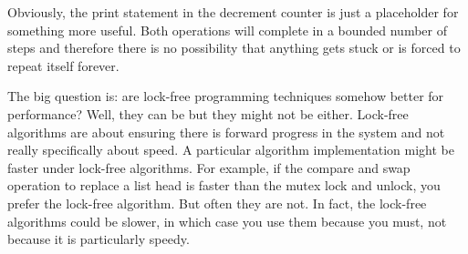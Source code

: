 Obviously, the print statement in the decrement counter is just a placeholder for something more useful. Both operations will complete in a bounded number of steps and therefore there is no possibility that anything gets stuck or is forced to repeat itself forever. 

The big question is: are lock-free programming techniques somehow better for performance? Well, they can be but they might not be either. Lock-free algorithms are about ensuring there is forward progress in the system and not really specifically about speed. A particular algorithm implementation might be faster under lock-free algorithms. For example, if the compare and swap operation to replace a list head is faster than the mutex lock and unlock, you prefer the lock-free algorithm. But often they are not. In fact, the lock-free algorithms could be slower, in which case you use them because you must, not because it is particularly speedy.




